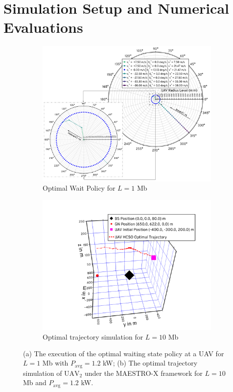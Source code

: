 \documentclass[10pt, twocolumn]{IEEEtran}
\theoremstyle{plain}
\theoremstyle{definition}
\theoremstyle{remark}
\begin{document}
\section{Simulation Setup and Numerical Evaluations}\label{S6}
\begin{figure} [t]
      \begin{subfigure}{0.5\linewidth}
	     \centering
         \includegraphics[width=0.8\linewidth]{figs/Optimal_Waiting_Policy_1Mb.png}
         \caption{Optimal Wait Policy for $L{=}1$ Mb}
		 \label{F6}
	 \end{subfigure}
     \begin{subfigure}{0.516\linewidth}
         \centering
  		 \includegraphics[width=0.8\linewidth]{figs/Optimal_UAV_Trajectory.png}
		 \caption{Optimal trajectory simulation for $L{=}10$ Mb}
         \label{F7}
     \end{subfigure}
     \caption{(a) The execution of the optimal waiting state policy at a UAV for $L{=}1$ Mb with $P_{\mathrm{avg}}{=}1.2$ kW; (b) The optimal trajectory simulation of $\text{UAV}_{2}$ under the MAESTRO-X framework for $L{=}10$ Mb and $P_{\text{avg}}{=}1.2$ kW.}
     \vspace{-6mm}
\end{figure}
\end{document}
